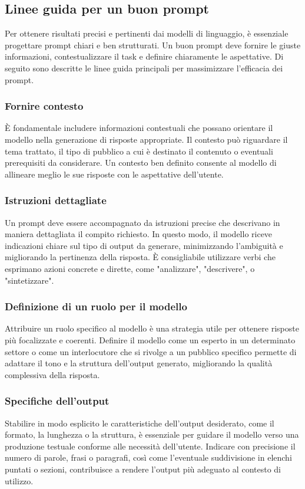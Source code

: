 \documentclass[target=mst,aauheader=,style=]{thud}
\begin{document}
\subsection{Linee guida per un buon prompt}
Per ottenere risultati precisi e pertinenti dai modelli di linguaggio, è essenziale progettare prompt chiari e ben strutturati. Un buon prompt deve fornire le giuste informazioni, contestualizzare il task e definire chiaramente le aspettative. Di seguito sono descritte le linee guida principali per massimizzare l'efficacia dei prompt.

\subsubsection{Fornire contesto}
È fondamentale includere informazioni contestuali che possano orientare il modello nella generazione di risposte appropriate. Il contesto può riguardare il tema trattato, il tipo di pubblico a cui è destinato il contenuto o eventuali prerequisiti da considerare. Un contesto ben definito consente al modello di allineare meglio le sue risposte con le aspettative dell’utente.

\subsubsection{Istruzioni dettagliate}
Un prompt deve essere accompagnato da istruzioni precise che descrivano in maniera dettagliata il compito richiesto. In questo modo, il modello riceve indicazioni chiare sul tipo di output da generare, minimizzando l'ambiguità e migliorando la pertinenza della risposta. È consigliabile utilizzare verbi che esprimano azioni concrete e dirette, come "analizzare", "descrivere", o "sintetizzare".

\subsubsection{Definizione di un ruolo per il modello}
Attribuire un ruolo specifico al modello è una strategia utile per ottenere risposte più focalizzate e coerenti. Definire il modello come un esperto in un determinato settore o come un interlocutore che si rivolge a un pubblico specifico permette di adattare il tono e la struttura dell’output generato, migliorando la qualità complessiva della risposta.

\subsubsection{Specifiche dell’output}
Stabilire in modo esplicito le caratteristiche dell’output desiderato, come il formato, la lunghezza o la struttura, è essenziale per guidare il modello verso una produzione testuale conforme alle necessità dell’utente. Indicare con precisione il numero di parole, frasi o paragrafi, così come l’eventuale suddivisione in elenchi puntati o sezioni, contribuisce a rendere l’output più adeguato al contesto di utilizzo.
\end{document}
